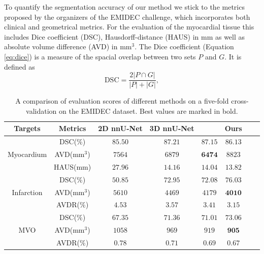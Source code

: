 \documentclass[preprint,5p,authoryear]{elsarticle}
\begin{document}
To quantify the segmentation accuracy of our method we stick to the metrics proposed by the organizers of the EMIDEC challenge, which incorporates both clinical and geometrical metrics. For the evaluation of the myocardial tissue this includes Dice coefficient (DSC), Hausdorff-distance (HAUS) in $\mathrm{mm}$ as well as absolute volume difference (AVD) in $\mathrm{mm}^3$. The Dice coefficient (Equation \ref{eq:dice}) is a measure of the spacial overlap between two sets $P$ and $G$. It is defined as  
\begin{equation}
    \label{eq:dice}
    \mathrm{DSC} = \frac{2 |P \cap G|}{|P|+|G|},
\end{equation}

\begin{table}[!t]
\caption{\label{tab:comp}A comparison of evaluation scores of different methods on a five-fold cross-validation on the EMIDEC dataset. Best values are marked in bold.}
\centering
\begin{tabular}{c c c c c c c c }
\hline
Targets    & Metrics             & 2D nnU-Net & 3D nnU-Net   & \cite{zhang2021cascaded} & Ours \\
\hline
           & DSC($\%$)           & $85.50$    & $\bm{87.21}$ & $87.15$                  & $86.13$\\
Myocardium & AVD($\mathrm{mm^3}$)& $7564$     & $6879$       & $\bm{6474}$              & $8823$\\
           & HAUS($\mathrm{mm}$) & $27.96$    & $14.16$      & $14.04$                  & $\bm{13.82}$ \\
\hline
           & DSC($\%$)           & $50.85$    & $72.95$      & $72.08$                  & $\bm{76.03}$ \\
Infarction & AVD($\mathrm{mm^3}$)& $5610$     & $4469$       & $4179$                   & $\bm{4010}$\\
           & AVDR($\%$)          & $4.53$     & $3.57$       & $3.41$                   & $\bm{3.15}$\\
\hline
           & DSC($\%$)           & $67.35$    & $71.36$      & $71.01$                  & $\bm{73.06}$ \\
MVO        & AVD($\mathrm{mm^3}$)& $1058$     & $969$        & $919$                    & $\bm{905}$ \\
           & AVDR($\%$)          & $0.78$     & $0.71$       & $0.69$                   & $\bm{0.67}$\\
\hline
\end{tabular}
\end{table}
\end{document}
